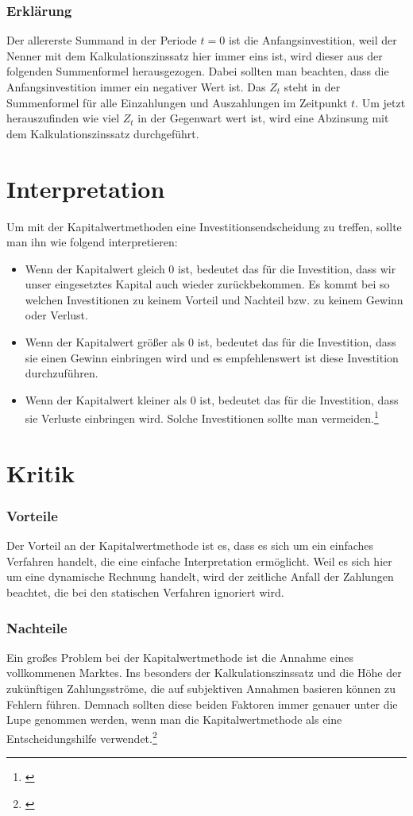\subsubsection{Erklärung}
Der allererste Summand in der Periode $t = 0$ ist die Anfangsinvestition, weil der Nenner mit dem Kalkulationszinssatz hier immer eins ist, wird dieser aus der folgenden Summenformel herausgezogen. Dabei sollten man beachten, dass die Anfangsinvestition immer ein negativer Wert ist. Das $Z_t$
steht in der Summenformel für alle Einzahlungen und Auszahlungen im Zeitpunkt $t$. Um jetzt herauszufinden wie viel $Z_t$ in der Gegenwart wert ist, wird eine Abzinsung mit dem Kalkulationszinssatz durchgeführt.
\section{Interpretation}
Um mit der Kapitalwertmethoden eine Investitionsendscheidung zu treffen, sollte man ihn wie folgend interpretieren:
\begin{itemize}
    \item Wenn der Kapitalwert gleich 0 ist, bedeutet das für die Investition, dass wir unser eingesetztes Kapital auch wieder zurückbekommen. Es kommt bei so welchen Investitionen zu keinem Vorteil und Nachteil bzw. zu keinem Gewinn oder Verlust.
    \item Wenn der Kapitalwert größer als 0 ist, bedeutet das für die Investition, dass sie einen Gewinn einbringen wird und es empfehlenswert ist diese Investition durchzuführen.
    \item Wenn der Kapitalwert kleiner als 0 ist, bedeutet das für die Investition, dass sie Verluste einbringen wird. Solche Investitionen sollte man vermeiden.\footnote{\cite{studyflix-kapitalwertmethode}}
\end{itemize}
\newpage
\section{Kritik}
\subsubsection{Vorteile}
Der Vorteil an der Kapitalwertmethode ist es, dass es sich um ein einfaches Verfahren handelt, die eine einfache Interpretation ermöglicht. Weil es sich hier um eine dynamische Rechnung handelt, wird der zeitliche Anfall der Zahlungen beachtet, die bei den statischen Verfahren ignoriert wird.
\subsubsection{Nachteile}
Ein großes Problem bei der Kapitalwertmethode ist die Annahme eines vollkommenen Marktes. Ins besonders der Kalkulationszinssatz und die Höhe der zukünftigen Zahlungsströme, die auf subjektiven Annahmen basieren können zu Fehlern führen. Demnach sollten diese beiden Faktoren immer genauer unter die Lupe genommen werden, wenn man die Kapitalwertmethode als eine Entscheidungshilfe verwendet.\footnote{\cite{wikipedia-kapitalwertmethode}}
